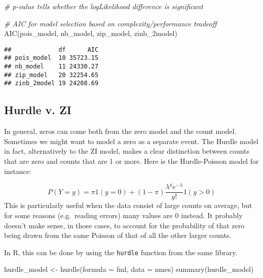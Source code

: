\documentclass[
  oneside]{book}
\newenvironment{Shaded}{\begin{snugshade}}{\end{snugshade}}
\newcommand{\AttributeTok}[1]{\textcolor[rgb]{0.77,0.63,0.00}{#1}}
\newcommand{\CommentTok}[1]{\textcolor[rgb]{0.56,0.35,0.01}{\textit{#1}}}
\newcommand{\FunctionTok}[1]{\textcolor[rgb]{0.00,0.00,0.00}{#1}}
\newcommand{\NormalTok}[1]{#1}
\newcommand{\OtherTok}[1]{\textcolor[rgb]{0.56,0.35,0.01}{#1}}
\begin{document}
\begin{Shaded}
\begin{Highlighting}[]
\CommentTok{\# p{-}value tells whether the logLikelihood difference is significant}

\CommentTok{\# AIC for model selection based on complexity/performance tradeoff}
\FunctionTok{AIC}\NormalTok{(pois\_model, nb\_model, zip\_model, zinb\_2model)}
\end{Highlighting}
\end{Shaded}

\begin{verbatim}
##             df      AIC
## pois_model  10 35723.15
## nb_model    11 24330.27
## zip_model   20 32254.65
## zinb_2model 19 24208.69
\end{verbatim}

\hypertarget{hurdle-v.-zi}{%
\subsection{Hurdle v. ZI}\label{hurdle-v.-zi}}

In general, zeros can come both from the zero model and the count model. Sometimes we might
want to model a zero as a separate event. The Hurdle model in fact, alternatively to the ZI model,
makes a clear distinction between counts that are zero and counts that are 1 or more. Here
is the Hurdle-Poisson model for instance:

\[
P(Y = y) = \pi \mathrm{1}(y = 0) + (1 - \pi) \frac{\lambda^{y} e^{-\lambda}}{y!} \mathrm{1}(y > 0)
\]
This is particularly useful when the data consist of large counts on average, but for
some reasons (e.g.~reading errors) many values are 0 instead. It probably doesn't make
sense, in those cases, to account for the probability of that zero being drawn from the same
Poisson of that of all the other larger counts.

In R, this can be done by using the \texttt{hurdle} function from the same library.

\begin{Shaded}
\begin{Highlighting}[]
\NormalTok{hurdle\_model }\OtherTok{\textless{}{-}} \FunctionTok{hurdle}\NormalTok{(}\AttributeTok{formula =}\NormalTok{ fml, }\AttributeTok{data =}\NormalTok{ nmes)}
\FunctionTok{summary}\NormalTok{(hurdle\_model)}
\end{Highlighting}
\end{Shaded}
\end{document}
